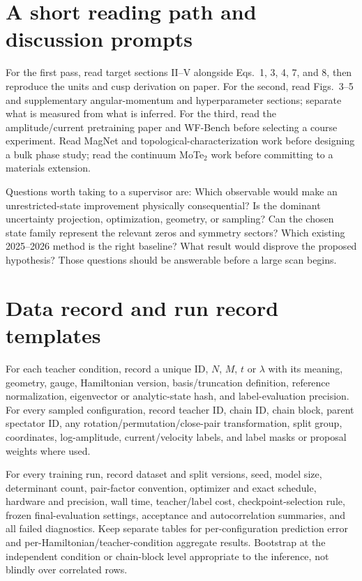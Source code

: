 \documentclass[11pt,letterpaper]{article}
\begin{document}
\appendix
\section{A short reading path and discussion prompts}

For the first pass, read target sections II--V alongside Eqs.~1, 3, 4, 7, and 8, then reproduce the units and cusp derivation on paper. For the second, read Figs.~3--5 and supplementary angular-momentum and hyperparameter sections; separate what is measured from what is inferred. For the third, read the amplitude/current pretraining paper and WF-Bench before selecting a course experiment. Read MagNet and topological-characterization work before designing a bulk phase study; read the continuum MoTe$_2$ work before committing to a materials extension.

Questions worth taking to a supervisor are: Which observable would make an unrestricted-state improvement physically consequential? Is the dominant uncertainty projection, optimization, geometry, or sampling? Can the chosen state family represent the relevant zeros and symmetry sectors? Which existing 2025--2026 method is the right baseline? What result would disprove the proposed hypothesis? Those questions should be answerable before a large scan begins.

\section{Data record and run record templates}

For each teacher condition, record a unique ID, $N$, $M$, $t$ or $\lambda$ with its meaning, geometry, gauge, Hamiltonian version, basis/truncation definition, reference normalization, eigenvector or analytic-state hash, and label-evaluation precision. For every sampled configuration, record teacher ID, chain ID, chain block, parent spectator ID, any rotation/permutation/close-pair transformation, split group, coordinates, log-amplitude, current/velocity labels, and label masks or proposal weights where used.

For every training run, record dataset and split versions, seed, model size, determinant count, pair-factor convention, optimizer and exact schedule, hardware and precision, wall time, teacher/label cost, checkpoint-selection rule, frozen final-evaluation settings, acceptance and autocorrelation summaries, and all failed diagnostics. Keep separate tables for per-configuration prediction error and per-Hamiltonian/teacher-condition aggregate results. Bootstrap at the independent condition or chain-block level appropriate to the inference, not blindly over correlated rows.
\end{document}
